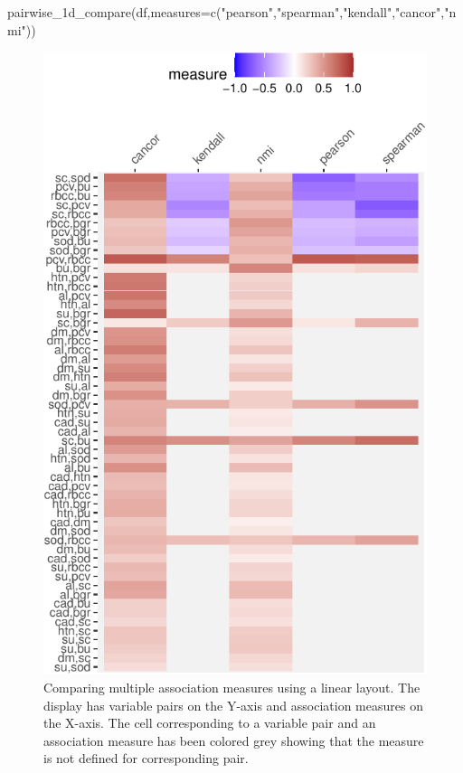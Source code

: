 \begin{Schunk}
\begin{Sinput}
pairwise_1d_compare(df,measures=c("pearson","spearman","kendall","cancor","nmi"))
\end{Sinput}
\begin{figure}

{\centering \includegraphics{rj_paper_files/figure-latex/compare-linear-1} 

}

\caption[Comparing multiple association measures using a linear layout]{Comparing multiple association measures using a linear layout. The display has variable pairs on the Y-axis and association measures on the X-axis. The cell corresponding to a variable pair and an association measure has been colored grey showing that the measure is not defined for corresponding pair.}\label{fig:compare-linear}
\end{figure}
\end{Schunk}

